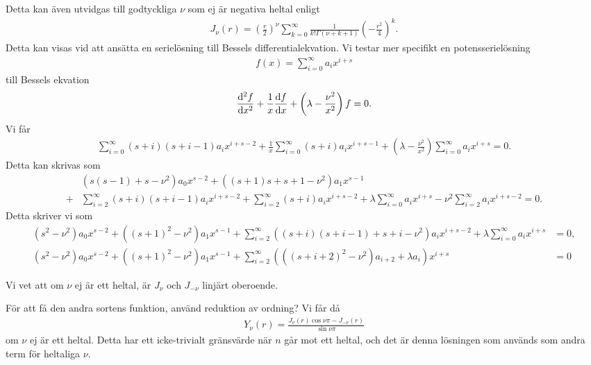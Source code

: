 Detta kan även utvidgas till godtyckliga $\nu$ som ej är negativa heltal enligt
\begin{align*}
	J_{\nu}(r) = \left(\frac{r}{2}\right)^{\nu}\sum\limits_{k = 0}^{\infty}\frac{1}{k!\Gamma(\nu + k + 1)}\left(-\frac{r^{2}}{4}\right)^{k}.
\end{align*}
Detta kan visas vid att ansätta en serielösning till Bessels differentialekvation. Vi testar mer specifikt en potensserielösning
\begin{align*}
	f(x) = \sum\limits_{i = 0}^{\infty}a_{i}x^{i + s}
\end{align*}
till Bessels ekvation
\begin{align*}
	\dv[2]{f}{x} + \frac{1}{x}\dv{f}{x} + \left(\lambda - \frac{\nu^{2}}{x^{2}}\right)f = 0.
\end{align*}
Vi får
\begin{align*}
	\sum\limits_{i = 0}^{\infty}(s + i)(s + i - 1)a_{i}x^{i + s - 2} + \frac{1}{x}\sum\limits_{i = 0}^{\infty}(s + i)a_{i}x^{i + s - 1} + \left(\lambda - \frac{\nu^{2}}{x^{2}}\right)\sum\limits_{i = 0}^{\infty}a_{i}x^{i + s} = 0.
\end{align*}
Detta kan skrivas som
\begin{align*}
	 &(s(s - 1) + s - \nu^{2})a_{0}x^{s - 2} + ((s + 1)s + s + 1 - \nu^{2})a_{1}x^{s - 1} \\
	+& \sum\limits_{i = 2}^{\infty}(s + i)(s + i - 1)a_{i}x^{i + s - 2} + \sum\limits_{i = 2}^{\infty}(s + i)a_{i}x^{i + s - 2} + \lambda\sum\limits_{i = 0}^{\infty}a_{i}x^{i + s} - \nu^{2}\sum\limits_{i = 2}^{\infty}a_{i}x^{i + s - 2} = 0.
\end{align*}
Detta skriver vi som
\begin{align*}
	(s^{2} - \nu^{2})a_{0}x^{s - 2} + ((s + 1)^{2} - \nu^{2})a_{1}x^{s - 1} + \sum\limits_{i = 2}^{\infty}((s + i)(s + i - 1) + s + i - \nu^{2})a_{i}x^{i + s - 2} + \lambda\sum\limits_{i = 0}^{\infty}a_{i}x^{i + s}                                              &= 0, \\
	(s^{2} - \nu^{2})a_{0}x^{s - 2} + ((s + 1)^{2} - \nu^{2})a_{1}x^{s - 1} + \sum\limits_{i = 2}^{\infty}(((s + i + 2)^{2} - \nu^{2})a_{i + 2} + \lambda a_{i})x^{i + s} &= 0
\end{align*}

Vi vet att om $\nu$ ej är ett heltal, är $J_{\nu}$ och $J_{-\nu}$ linjärt oberoende.

För att få den andra sortens funktion, använd reduktion av ordning? Vi får då
\begin{align*}
	Y_{\nu}(r) = \frac{J_{\nu}(r)\cos{\nu\pi} - J_{-\nu}(r)}{\sin{\nu\pi}}
\end{align*}
om $\nu$ ej är ett heltal. Detta har ett icke-trivialt gränsvärde när $n$ går mot ett heltal, och det är denna lösningen som används som andra term för heltaliga $\nu$.

